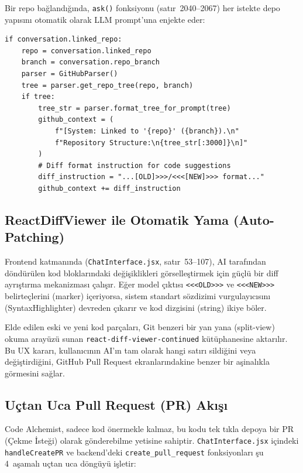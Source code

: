 \documentclass[12pt,a4paper]{article}
\begin{document}
Bir repo bağlandığında, \texttt{ask()} fonksiyonu (satır~2040--2067) her istekte depo yapısını otomatik olarak LLM prompt'una enjekte eder:

\begin{lstlisting}[style=pythonstyle, caption={GitHub Context Injection (app.py, satır 2040--2063)}, label=lst:context]
if conversation.linked_repo:
    repo = conversation.linked_repo
    branch = conversation.repo_branch
    parser = GitHubParser()
    tree = parser.get_repo_tree(repo, branch)
    if tree:
        tree_str = parser.format_tree_for_prompt(tree)
        github_context = (
            f"[System: Linked to '{repo}' ({branch}).\n"
            f"Repository Structure:\n{tree_str[:3000]}\n]"
        )
        # Diff format instruction for code suggestions
        diff_instruction = "...[OLD]>>>/<<<[NEW]>>> format..."
        github_context += diff_instruction
\end{lstlisting}

\subsection{ReactDiffViewer ile Otomatik Yama (Auto-Patching)}

Frontend katmanında (\texttt{ChatInterface.jsx}, satır~53--107), AI tarafından döndürülen kod bloklarındaki değişiklikleri görselleştirmek için güçlü bir diff ayrıştırma mekanizması çalışır. Eğer model çıktısı \texttt{<<<OLD>>>} ve \texttt{<<<NEW>>>} belirteçlerini (marker) içeriyorsa, sistem standart sözdizimi vurgulayıcısını (SyntaxHighlighter) devreden çıkarır ve kod dizgisini (string) ikiye böler.

Elde edilen eski ve yeni kod parçaları, Git benzeri bir yan yana (split-view) okuma arayüzü sunan \texttt{react-diff-viewer-continued} kütüphanesine aktarılır. Bu UX kararı, kullanıcının AI'ın tam olarak hangi satırı sildiğini veya değiştirdiğini, GitHub Pull Request ekranlarındakine benzer bir aşinalıkla görmesini sağlar. 

\subsection{Uçtan Uca Pull Request (PR) Akışı}

Code Alchemist, sadece kod önermekle kalmaz, bu kodu tek tıkla depoya bir PR (Çekme İsteği) olarak gönderebilme yetisine sahiptir. \texttt{ChatInterface.jsx} içindeki \texttt{handleCreatePR} ve backend'deki \texttt{create\_pull\_request} fonksiyonları şu 4~aşamalı uçtan uca döngüyü işletir:
\end{document}
